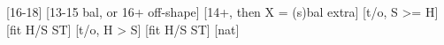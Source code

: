 \begin{bidsemi}
[16-18]
[13-15 bal, or 16+ off-shape]
[14+, then X = (s)bal extra]
[t/o, S >= H]
    [fit H/S ST]
[t/o, H > S]
    [fit H/S ST]
[nat]
\end{bidsemi}
